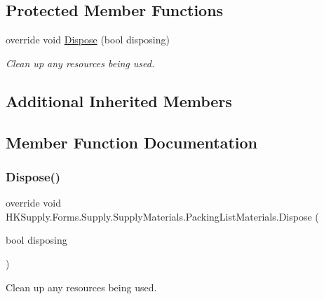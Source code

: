 \subsection*{Protected Member Functions}
\begin{DoxyCompactItemize}
\item 
override void \mbox{\hyperlink{class_h_k_supply_1_1_forms_1_1_supply_1_1_supply_materials_1_1_packing_list_materials_a62a4d7c1dbfa530aac0240477d659d5d}{Dispose}} (bool disposing)
\begin{DoxyCompactList}\small\item\em Clean up any resources being used. \end{DoxyCompactList}\end{DoxyCompactItemize}
\subsection*{Additional Inherited Members}


\subsection{Member Function Documentation}
\mbox{\label{class_h_k_supply_1_1_forms_1_1_supply_1_1_supply_materials_1_1_packing_list_materials_a62a4d7c1dbfa530aac0240477d659d5d}} 
\subsubsection{\texorpdfstring{Dispose()}{Dispose()}}
{\footnotesize\ttfamily override void H\+K\+Supply.\+Forms.\+Supply.\+Supply\+Materials.\+Packing\+List\+Materials.\+Dispose (\begin{DoxyParamCaption}\item[{bool}]{disposing }\end{DoxyParamCaption})\hspace{0.3cm}{\ttfamily [protected]}}



Clean up any resources being used. 


